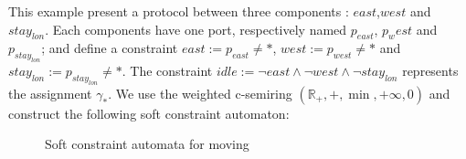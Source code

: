 

\begin{example}
	This example present a protocol between three components : $east$,$west$ and $stay_{lon}$. Each components have one port, respectively named $p_{east}$, $p_west$ and $p_{stay_{lon}}$; and define a constraint $east := p_{east} \not = *$, $west := p_{west} \not = *$ and $stay_{lon} := p_{stay_{lon}} \not = *$. The constraint $idle := \neg east \land \neg west \land \neg stay_{lon}$ represents the assignment $\gamma_*$. We use the weighted c-semiring $(\mathbb{R}_+,+,\min,+\infty,0)$ and construct the following soft constraint automaton:
	\begin{figure}[H]
		\centering
		\resizebox{8cm}{!}{}
		\caption{Soft constraint automata for moving}
		\label{moveSCA}
	\end{figure}
\end{example}
\vfill